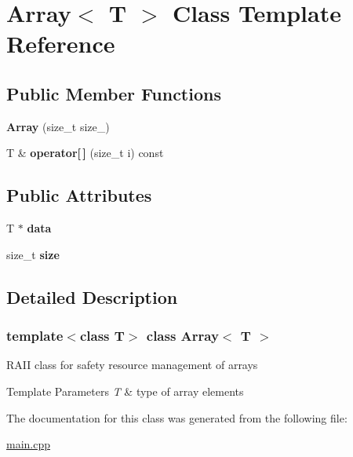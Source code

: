 \hypertarget{class_array}{}\section{Array$<$ T $>$ Class Template Reference}
\label{class_array}
\subsection*{Public Member Functions}
\begin{DoxyCompactItemize}
\item 
\mbox{\label{class_array_a6ae833b8b08178d8d51cadac28374f61}} 
{\bfseries Array} (size\+\_\+t size\+\_\+)
\item 
\mbox{\label{class_array_a3b3254bc69f6fd1a19f0daeacc03c691}} 
T \& {\bfseries operator\mbox{[}$\,$\mbox{]}} (size\+\_\+t i) const
\end{DoxyCompactItemize}
\subsection*{Public Attributes}
\begin{DoxyCompactItemize}
\item 
\mbox{\label{class_array_a1ed7a8632e383152e0f03c5eecf7e917}} 
T $\ast$ {\bfseries data}
\item 
\mbox{\label{class_array_ab1dd0b3a06b008bf93de58d1194a554a}} 
size\+\_\+t {\bfseries size}
\end{DoxyCompactItemize}


\subsection{Detailed Description}
\subsubsection*{template$<$class T$>$\newline
class Array$<$ T $>$}

R\+A\+II class for safety resource management of arrays


\begin{DoxyTemplParams}{Template Parameters}
{\em T} & type of array elements \\
\hline
\end{DoxyTemplParams}


The documentation for this class was generated from the following file\+:\begin{DoxyCompactItemize}
\item 
\mbox{\hyperlink{main_8cpp}{main.\+cpp}}\end{DoxyCompactItemize}
